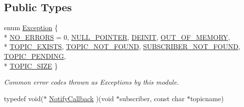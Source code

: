 \subsection*{Public Types}
\begin{DoxyCompactItemize}
\item 
enum \hyperlink{class_msg_broker_a29a59609f9ec3a1b8022f98f228f3c9c}{Exception} \{ \\*
\hyperlink{class_msg_broker_a29a59609f9ec3a1b8022f98f228f3c9cab742e8ffb9ad14f8c6fd47cfac899141}{N\-O\-\_\-\-E\-R\-R\-O\-R\-S} = 0, 
\hyperlink{class_msg_broker_a29a59609f9ec3a1b8022f98f228f3c9caad59920430adf0bb0f7c95bf51475e23}{N\-U\-L\-L\-\_\-\-P\-O\-I\-N\-T\-E\-R}, 
\hyperlink{class_msg_broker_a29a59609f9ec3a1b8022f98f228f3c9ca9d72afd7b38e8e78cc687b28196a32e2}{D\-E\-I\-N\-I\-T}, 
\hyperlink{class_msg_broker_a29a59609f9ec3a1b8022f98f228f3c9cac4968b9c0c7222025799479d3580ed88}{O\-U\-T\-\_\-\-O\-F\-\_\-\-M\-E\-M\-O\-R\-Y}, 
\\*
\hyperlink{class_msg_broker_a29a59609f9ec3a1b8022f98f228f3c9cad12f9a8ddb13dddb8cf7b99e9f6777da}{T\-O\-P\-I\-C\-\_\-\-E\-X\-I\-S\-T\-S}, 
\hyperlink{class_msg_broker_a29a59609f9ec3a1b8022f98f228f3c9caf71dcc7cb353ed43ce83a47c6db96476}{T\-O\-P\-I\-C\-\_\-\-N\-O\-T\-\_\-\-F\-O\-U\-N\-D}, 
\hyperlink{class_msg_broker_a29a59609f9ec3a1b8022f98f228f3c9ca7e930d24ce3ae7e4881612220c30f801}{S\-U\-B\-S\-C\-R\-I\-B\-E\-R\-\_\-\-N\-O\-T\-\_\-\-F\-O\-U\-N\-D}, 
\hyperlink{class_msg_broker_a29a59609f9ec3a1b8022f98f228f3c9caf925bd70ce652f03d12b8b0b359ba897}{T\-O\-P\-I\-C\-\_\-\-P\-E\-N\-D\-I\-N\-G}, 
\\*
\hyperlink{class_msg_broker_a29a59609f9ec3a1b8022f98f228f3c9caa1093c62e2d6da809e9118b0c5bc9221}{T\-O\-P\-I\-C\-\_\-\-S\-I\-Z\-E}
 \}
\begin{DoxyCompactList}\small\item\em Common error codes thrown as Exceptions by this module. \end{DoxyCompactList}\item 
typedef void($\ast$ \hyperlink{class_msg_broker_a830cd79418898c03e6b144b1e47d68d1}{Notify\-Callback} )(void $\ast$subscriber, const char $\ast$topicname)
\end{DoxyCompactItemize}
